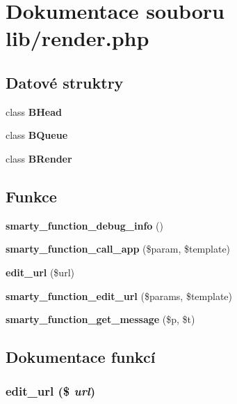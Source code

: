 \section{Dokumentace souboru lib/render.php}
\label{d1/d0e/render_8php}
\subsection*{Datové struktry}
\begin{DoxyCompactItemize}
\item 
class {\bf BHead}
\item 
class {\bf BQueue}
\item 
class {\bf BRender}
\end{DoxyCompactItemize}
\subsection*{Funkce}
\begin{DoxyCompactItemize}
\item 
{\bf smarty\_\-function\_\-debug\_\-info} ()
\item 
{\bf smarty\_\-function\_\-call\_\-app} (\$param, \$template)
\item 
{\bf edit\_\-url} (\$url)
\item 
{\bf smarty\_\-function\_\-edit\_\-url} (\$params, \$template)
\item 
{\bf smarty\_\-function\_\-get\_\-message} (\$p, \$t)
\end{DoxyCompactItemize}


\subsection{Dokumentace funkcí}
\subsubsection[{edit\_\-url}]{\setlength{\rightskip}{0pt plus 5cm}edit\_\-url (\$ {\em url})}\label{d1/d0e/render_8php_a9afb6c9daf92e71e2b59d78b9b688fa7}
